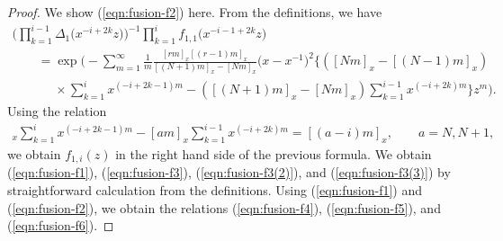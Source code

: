\documentclass[10pt,a4paper]{amsart}
\numberwithin{equation}{section}
\begin{document}
\begin{proof}
We show (\ref{eqn:fusion-f2}) here. From the definitions, we have
\begin{gather*}
\Bigg(\prod_{k=1}^{i-1}\Delta_1\big(x^{-i+2k}z\big)\Bigg)^{-1}
\prod_{k=1}^i f_{1,1}\big(x^{-i-1+2k}z\big)
\\ \qquad
{}=\exp\Biggl(-\sum_{m=1}^\infty
\frac{1}{m}\frac{[rm]_x[(r-1)m]_x}{[(N+1)m]_x-[Nm]_x}\big(x-x^{-1}\big)^2
\Biggl\{([Nm]_x-[(N-1)m]_x)
\\ \qquad\phantom{=}
{}\times\sum_{k=1}^i x^{(-i+2k-1)m}-([(N+1)m]_x-[Nm]_x)
\sum_{k=1}^{i-1}x^{(-i+2k)m}\Biggr\}z^m\Biggr).
\end{gather*}
Using the relation
\begin{gather*}
[(a-1)m]_x\sum_{k=1}^i x^{(-i+2k-1)m}-[a m]_x\sum_{k=1}^{i-1}x^{(-i+2k)m}=[(a-i)m]_x,\qquad a=N, N+1,
\end{gather*}
we obtain $f_{1,i}(z)$ in the right hand side of the previous formula.
We obtain (\ref{eqn:fusion-f1}), (\ref{eqn:fusion-f3}), (\ref{eqn:fusion-f3(2)}), and (\ref{eqn:fusion-f3(3)})
by straightforward calculation from the definitions.
Using (\ref{eqn:fusion-f1}) and (\ref{eqn:fusion-f2}),
we obtain the relations (\ref{eqn:fusion-f4}), (\ref{eqn:fusion-f5}), and (\ref{eqn:fusion-f6}).
\end{proof}
\end{document}
